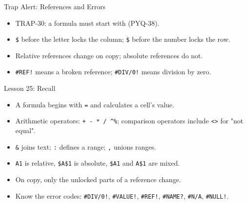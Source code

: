 \documentclass[aspectratio=169]{beamer}
\begin{document}
\begin{frame}{Trap Alert: References and Errors}
  \begin{itemize}
    \item TRAP-30: a formula must start with \key{\texttt{=}} (PYQ-38).
    \item \texttt{\$} before the letter locks the column; \texttt{\$} before
      the number locks the row.
    \item Relative references change on copy; absolute references do not.
    \item \texttt{\#REF!} means a broken reference;
      \texttt{\#DIV/0!} means division by zero.
  \end{itemize}
\end{frame}

\begin{frame}{Lesson 25: Recall}
  \begin{itemize}
    \item A formula begins with \texttt{=} and calculates a cell's value.
    \item Arithmetic operators: \texttt{+ - * / \textasciicircum \%};
      comparison operators include \texttt{<>} for "not equal".
    \item \texttt{\&} joins text; \texttt{:} defines a range;
      \texttt{,} unions ranges.
    \item \texttt{A1} is relative, \texttt{\$A\$1} is absolute,
      \texttt{\$A1} and \texttt{A\$1} are mixed.
    \item On copy, only the unlocked parts of a reference change.
    \item Know the error codes: \texttt{\#DIV/0!}, \texttt{\#VALUE!},
      \texttt{\#REF!}, \texttt{\#NAME?}, \texttt{\#N/A}, \texttt{\#NULL!}.
  \end{itemize}
\end{frame}
\end{document}
